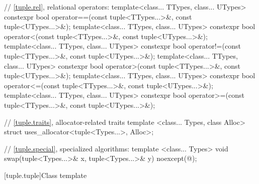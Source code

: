 \begin{codeblock}
{  // \ref{tuple.rel}, relational operators:
  template<class... TTypes, class... UTypes>
    constexpr bool operator==(const tuple<TTypes...>&, const tuple<UTypes...>&);
  template<class... TTypes, class... UTypes>
    constexpr bool operator<(const tuple<TTypes...>&, const tuple<UTypes...>&);
  template<class... TTypes, class... UTypes>
    constexpr bool operator!=(const tuple<TTypes...>&, const tuple<UTypes...>&);
  template<class... TTypes, class... UTypes>
    constexpr bool operator>(const tuple<TTypes...>&, const tuple<UTypes...>&);
  template<class... TTypes, class... UTypes>
    constexpr bool operator<=(const tuple<TTypes...>&, const tuple<UTypes...>&);
  template<class... TTypes, class... UTypes>
    constexpr bool operator>=(const tuple<TTypes...>&, const tuple<UTypes...>&);

  // \ref{tuple.traits}, allocator-related traits
  template <class... Types, class Alloc>
    struct uses_allocator<tuple<Types...>, Alloc>;

  // \ref{tuple.special}, specialized algorithms:
  template <class... Types>
    void swap(tuple<Types...>& x, tuple<Types...>& y) noexcept(@\seebelow@);
}
\end{codeblock}

[tuple.tuple]{Class template }

